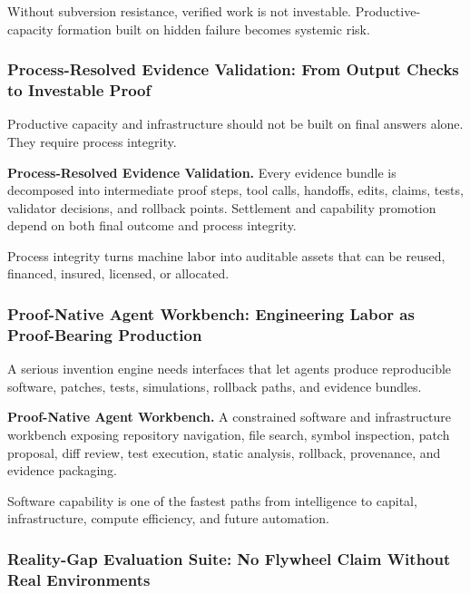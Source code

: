 Without subversion resistance, verified work is not investable.
Productive-capacity formation built on hidden failure becomes systemic
risk.

\subsubsection{Process-Resolved Evidence Validation: From Output Checks
to Investable
Proof}\label{process-resolved-evidence-validation-from-output-checks-to-investable-proof}

Productive capacity and infrastructure should not be built on final
answers alone. They require process integrity.

\textbf{Process-Resolved Evidence Validation.} Every evidence bundle is
decomposed into intermediate proof steps, tool calls, handoffs, edits,
claims, tests, validator decisions, and rollback points. Settlement and
capability promotion depend on both final outcome and process integrity.

Process integrity turns machine labor into auditable assets that can be
reused, financed, insured, licensed, or allocated.

\subsubsection{Proof-Native Agent Workbench: Engineering Labor as
Proof-Bearing
Production}\label{proof-native-agent-workbench-engineering-labor-as-proof-bearing-production}

A serious invention engine needs interfaces that let agents produce
reproducible software, patches, tests, simulations, rollback paths, and
evidence bundles.

\textbf{Proof-Native Agent Workbench.} A constrained software and
infrastructure workbench exposing repository navigation, file search,
symbol inspection, patch proposal, diff review, test execution, static
analysis, rollback, provenance, and evidence packaging.

Software capability is one of the fastest paths from intelligence to
capital, infrastructure, compute efficiency, and future automation.

\subsubsection{Reality-Gap Evaluation Suite: No Flywheel Claim Without
Real
Environments}\label{reality-gap-evaluation-suite-no-flywheel-claim-without-real-environments}

